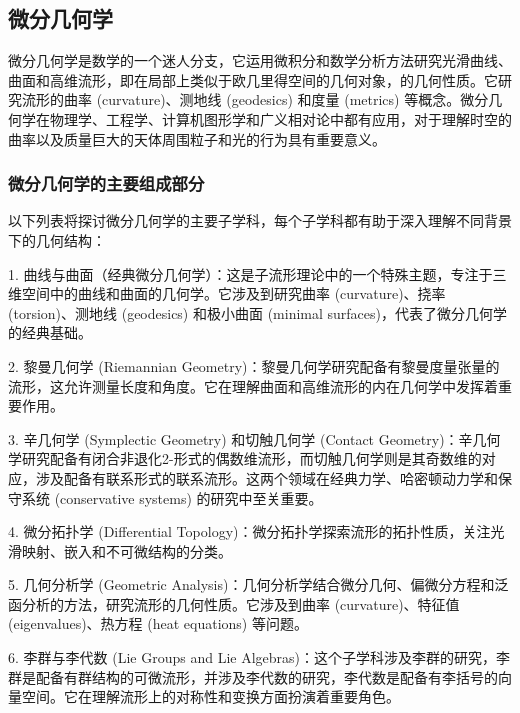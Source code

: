 
\begin{issues}
\issueAi
\end{issues}

\subsection{微分几何学}

微分几何学是数学的一个迷人分支，它运用微积分和数学分析方法研究光滑曲线、曲面和高维流形，即在局部上类似于欧几里得空间的几何对象，的几何性质。它研究流形的曲率 (curvature)、测地线 (geodesics) 和度量 (metrics) 等概念。微分几何学在物理学、工程学、计算机图形学和广义相对论中都有应用，对于理解时空的曲率以及质量巨大的天体周围粒子和光的行为具有重要意义。

\subsubsection{微分几何学的主要组成部分}

以下列表将探讨微分几何学的主要子学科，每个子学科都有助于深入理解不同背景下的几何结构：

1. 曲线与曲面（经典微分几何学）：这是子流形理论中的一个特殊主题，专注于三维空间中的曲线和曲面的几何学。它涉及到研究曲率 (curvature)、挠率 (torsion)、测地线 (geodesics) 和极小曲面 (minimal surfaces)，代表了微分几何学的经典基础。

2. 黎曼几何学 (Riemannian Geometry)：黎曼几何学研究配备有黎曼度量张量的流形，这允许测量长度和角度。它在理解曲面和高维流形的内在几何学中发挥着重要作用。

3. 辛几何学 (Symplectic Geometry) 和切触几何学 (Contact Geometry)：辛几何学研究配备有闭合非退化2-形式的偶数维流形，而切触几何学则是其奇数维的对应，涉及配备有联系形式的联系流形。这两个领域在经典力学、哈密顿动力学和保守系统 (conservative systems) 的研究中至关重要。

4. 微分拓扑学 (Differential Topology)：微分拓扑学探索流形的拓扑性质，关注光滑映射、嵌入和不可微结构的分类。

5. 几何分析学 (Geometric Analysis)：几何分析学结合微分几何、偏微分方程和泛函分析的方法，研究流形的几何性质。它涉及到曲率 (curvature)、特征值 (eigenvalues)、热方程 (heat equations) 等问题。

6. 李群与李代数 (Lie Groups and Lie Algebras)：这个子学科涉及李群的研究，李群是配备有群结构的可微流形，并涉及李代数的研究，李代数是配备有李括号的向量空间。它在理解流形上的对称性和变换方面扮演着重要角色。

